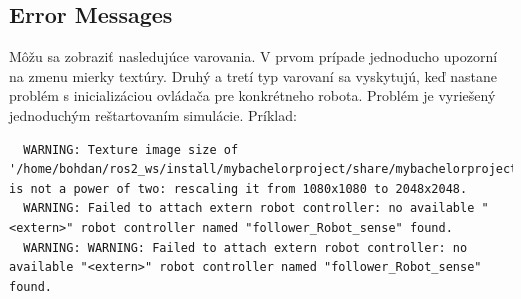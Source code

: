 \documentclass[a4paper]{feidippp}
\begin{document}

\subsection{Error Messages}
Môžu sa zobraziť nasledujúce varovania. V prvom prípade jednoducho upozorní na zmenu mierky textúry. Druhý a tretí typ varovaní sa vyskytujú, keď nastane problém s inicializáciou ovládača pre konkrétneho robota. Problém je vyriešený jednoduchým reštartovaním simulácie. Príklad:
\begin{lstlisting}
  WARNING: Texture image size of '/home/bohdan/ros2_ws/install/mybachelorproject/share/mybachelorproject/worlds/textures/loop.jpg' is not a power of two: rescaling it from 1080x1080 to 2048x2048.
  WARNING: Failed to attach extern robot controller: no available "<extern>" robot controller named "follower_Robot_sense" found.
  WARNING: WARNING: Failed to attach extern robot controller: no available "<extern>" robot controller named "follower_Robot_sense" found.
\end{lstlisting}









\end{document}
